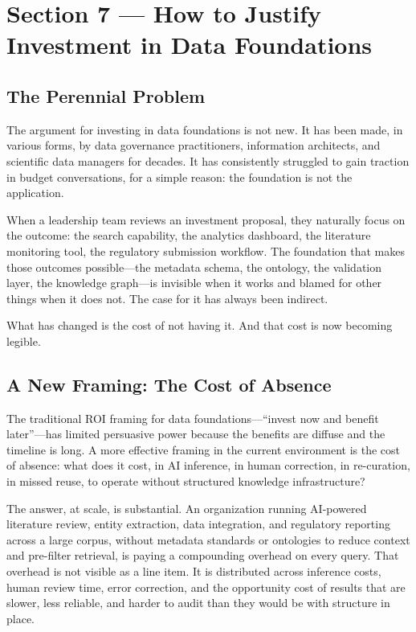 \documentclass[man,12pt,donotrepeattitle]{apa7}
\begin{document}

\section{Section 7 --- How to Justify Investment in Data Foundations}

\subsection{The Perennial Problem}

The argument for investing in data foundations is not new. It has been
made, in various forms, by data governance practitioners, information
architects, and scientific data managers for decades. It has consistently
struggled to gain traction in budget conversations, for a simple reason: the
foundation is not the application.

When a leadership team reviews an investment proposal, they naturally focus
on the outcome: the search capability, the analytics dashboard, the
literature monitoring tool, the regulatory submission workflow. The
foundation that makes those outcomes possible---the metadata schema, the
ontology, the validation layer, the knowledge graph---is invisible when it
works and blamed for other things when it does not. The case for it has
always been indirect.

What has changed is the cost of not having it. And that cost is now becoming
legible.

\subsection{A New Framing: The Cost of Absence}

The traditional ROI framing for data foundations---``invest now and benefit
later''---has limited persuasive power because the benefits are diffuse and
the timeline is long. A more effective framing in the current environment is
the cost of absence: what does it cost, in AI inference, in human
correction, in re-curation, in missed reuse, to operate without structured
knowledge infrastructure?

The answer, at scale, is substantial. An organization running AI-powered
literature review, entity extraction, data integration, and regulatory
reporting across a large corpus, without metadata standards or ontologies to
reduce context and pre-filter retrieval, is paying a compounding overhead on
every query. That overhead is not visible as a line item. It is distributed
across inference costs, human review time, error correction, and the
opportunity cost of results that are slower, less reliable, and harder to
audit than they would be with structure in place.
\end{document}
